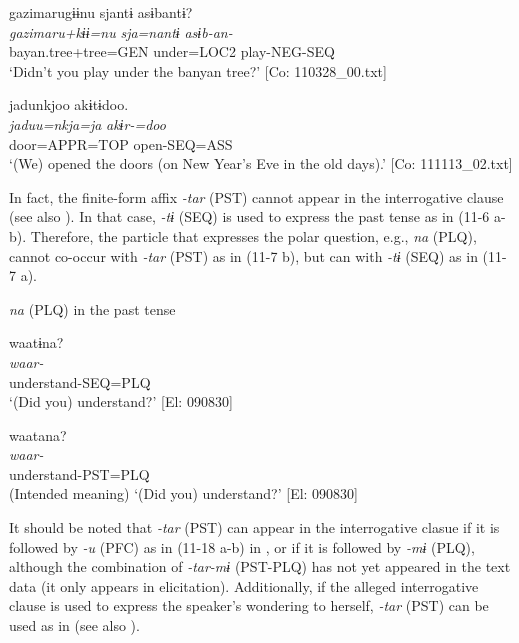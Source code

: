   \ex  
      \glll    gazimarugɨɨnu  sjantɨ  asɨbantɨ?\\
      \textit{gazimaru+kɨɨ=nu}  \textit{sja=nantɨ}  \textit{asɨb-an-}\\
      bayan.tree+tree=GEN  under=LOC2  play-NEG-SEQ\\
      \glt       ‘Didn’t you play under the banyan tree?’ [Co: 110328\_00.txt]

  \ex  
      \glll    jadunkjoo  akɨtɨdoo.\\
      \textit{jaduu=nkja=ja}  \textit{akɨr-=doo}\\
      door=APPR=TOP  open-SEQ=ASS\\
      \glt       ‘(We) opened the doors (on New Year’s Eve in the old days).’ [Co: 111113\_02.txt]
\z
\z

  In fact, the finite-form affix \textit{{}-tar} (PST) cannot appear in the interrogative clause (see also ). In that case, \textit{{}-tɨ} (SEQ) is used to express the past tense as in (11-6 a-b). Therefore, the particle that expresses the polar question, e.g., \textit{na} (PLQ), cannot co-occur with \textit{{}-tar} (PST) as in (11-7 b), but can with \textit{{}-tɨ} (SEQ) as in (11-7 a).

\ea\label{ex:11-7}  \textit{na} (PLQ) in the past tense

  \ea  
      \glll    waatɨna?\\
      \textit{waar-}\\
      understand-SEQ=PLQ\\
      \glt       ‘(Did you) understand?’ [El: 090830]

  \ex  
      \glll    *waatana?\\
       \textit{waar-}\\
      understand-PST=PLQ\\
      \glt       (Intended meaning) ‘(Did you) understand?’ [El: 090830]
\z
\z

  It should be noted that \textit{{}-tar} (PST) can appear in the interrogative clasue if it is followed by \textit{{}-u} (PFC) as in (11-18 a-b) in , or if it is followed by \textit{{}-mɨ} (PLQ), although the combination of \textit{{}-tar-mɨ} (PST-PLQ) has not yet appeared in the text data (it only appears in elicitation). Additionally, if the alleged interrogative clause is used to express the speaker’s wondering to herself, \textit{{}-tar} (PST) can be used as in  (see also ).

